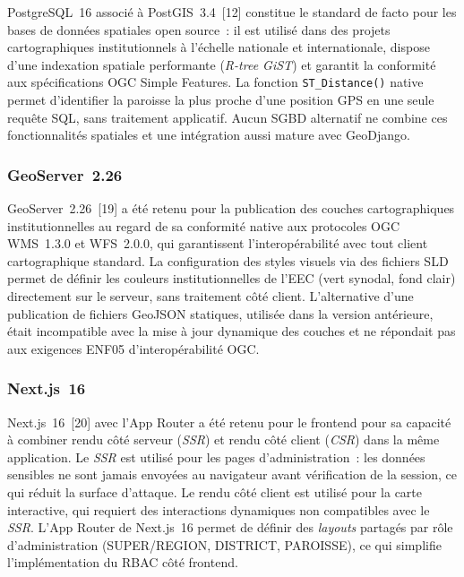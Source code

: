 \documentclass[12pt, a4paper]{report}
\begin{document}
PostgreSQL~16 associé à PostGIS~3.4~[12] constitue le
standard de facto pour les bases de données spatiales open source~: il est
utilisé dans des projets cartographiques institutionnels à l'échelle nationale
et internationale, dispose d'une indexation spatiale performante
(\textit{R-tree GiST}) et garantit la conformité aux spécifications OGC
Simple Features. La fonction \texttt{ST\_Distance()} native permet
d'identifier la paroisse la plus proche d'une position GPS en une seule
requête SQL, sans traitement applicatif. Aucun SGBD alternatif ne combine
ces fonctionnalités spatiales et une intégration aussi mature avec GeoDjango.

\subsubsection{GeoServer~2.26}

GeoServer~2.26~[19] a été retenu pour la publication des
couches cartographiques institutionnelles au regard de sa conformité native
aux protocoles OGC WMS~1.3.0 et WFS~2.0.0, qui garantissent
l'interopérabilité avec tout client cartographique standard. La
configuration des styles visuels via des fichiers SLD permet de définir les
couleurs institutionnelles de l'EEC (vert synodal, fond clair) directement
sur le serveur, sans traitement côté client. L'alternative d'une
publication de fichiers GeoJSON statiques, utilisée dans la version
antérieure, était incompatible avec la mise à jour dynamique des couches
et ne répondait pas aux exigences ENF05 d'interopérabilité OGC.

\subsubsection{Next.js~16}

Next.js~16~[20] avec l'App Router a été retenu pour le frontend
pour sa capacité à combiner rendu côté serveur (\textit{SSR}) et rendu côté
client (\textit{CSR}) dans la même application. Le \textit{SSR} est
utilisé pour les pages d'administration~: les données sensibles ne sont
jamais envoyées au navigateur avant vérification de la session, ce qui
réduit la surface d'attaque. Le rendu côté client est utilisé pour la carte
interactive, qui requiert des interactions dynamiques non compatibles avec
le \textit{SSR}. L'App Router de Next.js~16 permet de définir des
\textit{layouts} partagés par rôle d'administration (SUPER/REGION,
DISTRICT, PAROISSE), ce qui simplifie l'implémentation du RBAC côté
frontend.
\end{document}
